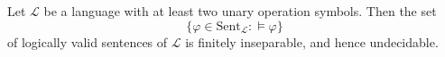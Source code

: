 Let $\mathcal{L}$ be a language with at least two unary operation symbols. Then the set
$$
\{\varphi \in \text{Sent}_{\mathcal{L}} : \models \varphi\}
$$
of logically valid sentences of $\mathcal{L}$ is finitely inseparable, and hence undecidable.
